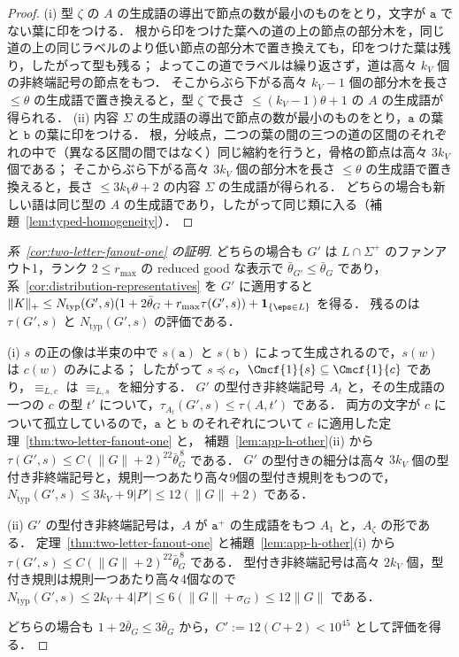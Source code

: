 \begin{proof}
(i) 型 $\zeta$ の $A$ の生成語の導出で節点の数が最小のものをとり，文字が $\mathtt a$ でない葉に印をつける．
根から印をつけた葉への道の上の節点の部分木を，同じ道の上の同じラベルのより低い節点の部分木で置き換えても，印をつけた葉は残り，したがって型も残る；
よってこの道でラベルは繰り返さず，道は高々 $k_V$ 個の非終端記号の節点をもつ．
そこからぶら下がる高々 $k_V-1$ 個の部分木を長さ $\le\theta$ の生成語で置き換えると，型 $\zeta$ で長さ $\le(k_V-1)\theta+1$ の $A$ の生成語が得られる．
(ii) 内容 $\Sigma$ の生成語の導出で節点の数が最小のものをとり，$\mathtt a$ の葉と $\mathtt b$ の葉に印をつける．
根，分岐点，二つの葉の間の三つの道の区間のそれぞれの中で（異なる区間の間ではなく）同じ縮約を行うと，骨格の節点は高々 $3k_V$ 個である；
そこからぶら下がる高々 $3k_V$ 個の部分木を長さ $\le\theta$ の生成語で置き換えると，長さ $\le3k_V\theta+2$ の内容 $\Sigma$ の生成語が得られる．
どちらの場合も新しい語は同じ型の $A$ の生成語であり，したがって同じ類に入る（補題~\ref{lem:typed-homogeneity}）．
\end{proof}

\begin{proof}[系~\ref{cor:two-letter-fanout-one} の証明]
どちらの場合も $G'$ は $L\cap\Sigma^+$ のファンアウト1，ランク $2\le r_{\max}$ の reduced good な表示で $\bar\theta_{G'}\le\bar\theta_G$ であり，
系~\ref{cor:distribution-representatives} を $G'$ に適用すると
$\|K\|_+\le N_{\mathrm{typ}}(G',s)(1+2\bar\theta_G+r_{\max}\tau(G',s))+\mathbf 1_{\{\eps\in L\}}$ を得る．
残るのは $\tau(G',s)$ と $N_{\mathrm{typ}}(G',s)$ の評価である．

(i) $s$ の正の像は半束の中で $s(\mathtt a)$ と $s(\mathtt b)$ によって生成されるので，$s(w)$ は $c(w)$ のみによる；
したがって $s\preceq c$，$\Cmcf{1}{s}\subseteq\Cmcf{1}{c}$ であり，$\equiv_{L,c}$ は $\equiv_{L,s}$ を細分する．
$G'$ の型付き非終端記号 $A_t$ と，その生成語の一つの $c$ の型 $t'$ について，$\tau_{A_t}(G',s)\le\tau(A,t')$ である．
両方の文字が $c$ について孤立しているので，$\mathtt a$ と $\mathtt b$ のそれぞれについて $c$ に適用した定理~\ref{thm:two-letter-fanout-one} と，
補題~\ref{lem:app-h-other}(ii) から $\tau(G',s)\le C(\|G\|+2)^{22}\bar\theta_G^{\,8}$ である．
$G'$ の型付きの細分は高々 $3k_V$ 個の型付き非終端記号と，規則一つあたり高々9個の型付き規則をもつので，
$N_{\mathrm{typ}}(G',s)\le3k_V+9|P'|\le12(\|G\|+2)$ である．

(ii) $G'$ の型付き非終端記号は，$A$ が $\mathtt a^+$ の生成語をもつ $A_1$ と，$A_\zeta$ の形である．
定理~\ref{thm:two-letter-fanout-one} と補題~\ref{lem:app-h-other}(i) から $\tau(G',s)\le C(\|G\|+2)^{22}\bar\theta_G^{\,8}$ である．
型付き非終端記号は高々 $2k_V$ 個，型付き規則は規則一つあたり高々4個なので
$N_{\mathrm{typ}}(G',s)\le2k_V+4|P'|\le6(\|G\|+\sigma_G)\le12\|G\|$ である．

どちらの場合も $1+2\bar\theta_G\le3\bar\theta_G$ から，$C':=12(C+2)<10^{45}$ として評価を得る．
\end{proof}


